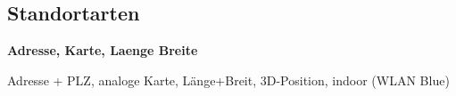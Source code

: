 \subsection{Standortarten}

\textbf{Adresse, Karte, Laenge Breite}

Adresse + PLZ, analoge Karte, Länge+Breit, 3D-Position, indoor (WLAN Blue)